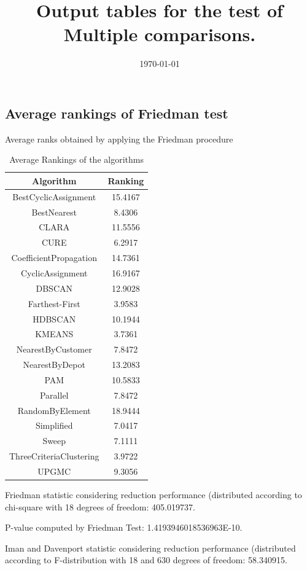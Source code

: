 \documentclass[a4paper,10pt]{article}
\title{Output tables for the test of Multiple comparisons.}
\author{}
\date{\today}
\begin{document}
\begin{landscape}
\pagestyle{empty}
\maketitle
\thispagestyle{empty}
\section{Average rankings of Friedman test}



Average ranks obtained by applying the Friedman procedure

\begin{table}[!htp]
\centering
\begin{tabular}{|c|c|}\hline
Algorithm&Ranking\\\hline
BestCyclicAssignment & 15.4167\\
BestNearest & 8.4306\\
CLARA & 11.5556\\
CURE & 6.2917\\
CoefficientPropagation & 14.7361\\
CyclicAssignment & 16.9167\\
DBSCAN & 12.9028\\
Farthest-First & 3.9583\\
HDBSCAN & 10.1944\\
KMEANS & 3.7361\\
NearestByCustomer & 7.8472\\
NearestByDepot & 13.2083\\
PAM & 10.5833\\
Parallel & 7.8472\\
RandomByElement & 18.9444\\
Simplified & 7.0417\\
Sweep & 7.1111\\
ThreeCriteriaClustering & 3.9722\\
UPGMC & 9.3056\\
\hline
\end{tabular}
\caption{Average Rankings of the algorithms}
\end{table}

Friedman statistic considering reduction performance (distributed according to chi-square with 18 degrees of freedom: 405.019737.

P-value computed by Friedman Test: 1.4193946018536963E-10.\newline

Iman and Davenport statistic considering reduction performance (distributed according to F-distribution with 18 and 630 degrees of freedom: 58.340915.


\end{landscape}
\end{document}
